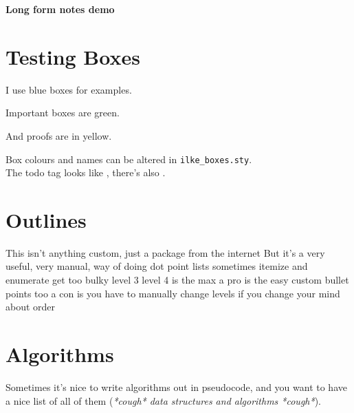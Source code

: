 \documentclass[11pt]{article}
\title{}
\author{Ilke Dincer}
\date{}
\begin{document}
\begin{center}
    \LARGE
    \textbf{Long form notes demo}
\end{center}

\tableofcontents \label{toc}


\pagebreak
{}
\section{Testing Boxes}

\begin{example-box}
  I use blue boxes for examples. 
\end{example-box}


\begin{important-box}
Important boxes are green. 
\end{important-box}

\begin{proof-box}
  And proofs are in yellow. 
\end{proof-box}

Box colours and names can be altered in \texttt{ilke\_boxes.sty}. \\


The todo tag looks like \TODO, there's also \CITATION.

\section{Outlines}

\begin{outline}
\0 This isn't anything custom, just a package from the internet
  \1 But it's a very useful, very manual, way of doing dot point lists
    \2 sometimes itemize and enumerate get too bulky
      \3 level 3
        \4 level 4 is the max
  \1[+] a pro is the easy custom bullet points too
  \1[-] a con is you have to manually change levels if you change your mind about order
\end{outline}


\section{Algorithms}
Sometimes it's nice to write algorithms out in pseudocode, and you want to have a nice list of all of them (\textit{*cough* data structures and algorithms *cough*}). 
\end{document}
